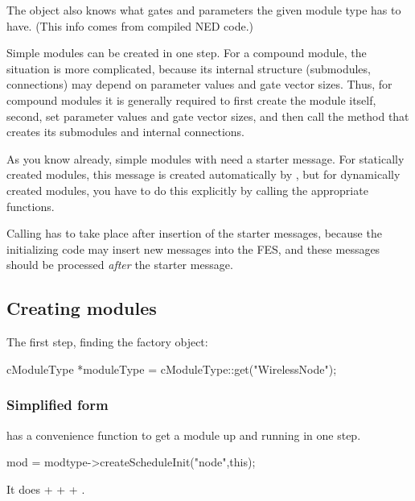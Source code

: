 The  object also knows what gates and
parameters the given module type has to have. (This info comes from
compiled NED code.)

Simple modules can be created in one step. For a compound module, the
situation is more complicated, because its internal structure
(submodules, connections) may depend on parameter values and gate
vector sizes. Thus, for compound modules it is generally required to
first create the module itself, second, set parameter values and gate
vector sizes, and then call the method that creates its submodules and
internal connections.

As you know already, simple modules with  need a
starter message. For statically created
modules, this message is created automatically by {\opp}, but for
dynamically created modules, you have to do this explicitly by calling
the appropriate functions.

Calling  has to take place after insertion of the
starter messages, because the initializing code may insert new messages
into the FES, and these messages should be processed
\textit{after} the starter message.

%
%


\subsection{Creating modules}

The first step, finding the factory object:

\begin{cpp}
cModuleType *moduleType = cModuleType::get("WirelessNode");
\end{cpp}


\subsubsection{Simplified form}

 has a
convenience function to get a module up and running in one step.

\begin{cpp}
mod = modtype->createScheduleInit("node",this);
\end{cpp}

It does  +  +
 + .

